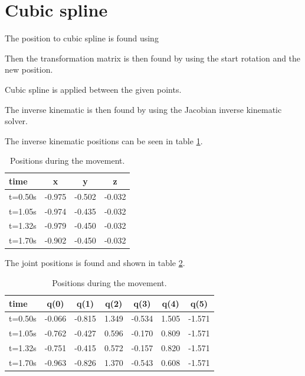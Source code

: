 \section{Cubic spline}

The position to cubic spline is found using \cite[equation 5.23]{book:roboticNotes}

Then the transformation matrix is then found by using the start rotation and the new position.

Cubic spline is applied between the given points.

The inverse kinematic is then found by using the Jacobian inverse kinematic solver.

The inverse kinematic positions can be seen in table \ref{tb:positions}.

\begin{table}[h]
\centering
\begin{tabular}{l|*{3}{c} }
 time    & x      & y      & z      \\ \hline       
 t=0.50s & -0.975 & -0.502 & -0.032 \\
 t=1.05s & -0.974 & -0.435 & -0.032 \\
 t=1.32s & -0.979 & -0.450 & -0.032 \\
 t=1.70s & -0.902 & -0.450 & -0.032 \\
\end{tabular}
\caption{Positions during the movement.}
\label{tb:positions}
\end{table}

The joint positions is found and shown in table \ref{tb:joint_positions}.

\begin{table}[h]
\centering
\begin{tabular}{l|*{6}{c} }
 time    & q(0)   & q(1)   & q(2)  & q(3)   & q(4)  & q(5)   \\ \hline       
 t=0.50s & -0.066 & -0.815 & 1.349 & -0.534 & 1.505 & -1.571 \\
 t=1.05s & -0.762 & -0.427 & 0.596 & -0.170 & 0.809 & -1.571 \\
 t=1.32s & -0.751 & -0.415 & 0.572 & -0.157 & 0.820 & -1.571 \\
 t=1.70s & -0.963 & -0.826 & 1.370 & -0.543 & 0.608 & -1.571 \\
\end{tabular}
\caption{Positions during the movement.}
\label{tb:joint_positions}
\end{table}

